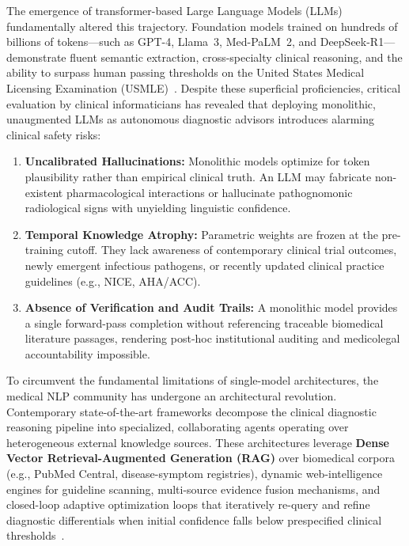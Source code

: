 \documentclass[conference]{IEEEtran}
\begin{document}
The emergence of transformer-based Large Language Models (LLMs) fundamentally altered this trajectory. Foundation models trained on hundreds of billions of tokens---such as GPT-4, Llama~3, Med-PaLM~2, and DeepSeek-R1---demonstrate fluent semantic extraction, cross-specialty clinical reasoning, and the ability to surpass human passing thresholds on the United States Medical Licensing Examination (USMLE)~\cite{singhal2023large, nori2023capabilities}. Despite these superficial proficiencies, critical evaluation by clinical informaticians has revealed that deploying monolithic, unaugmented LLMs as autonomous diagnostic advisors introduces alarming clinical safety risks:
\begin{enumerate}
    \item \textbf{Uncalibrated Hallucinations:} Monolithic models optimize for token plausibility rather than empirical clinical truth. An LLM may fabricate non-existent pharmacological interactions or hallucinate pathognomonic radiological signs with unyielding linguistic confidence.
    \item \textbf{Temporal Knowledge Atrophy:} Parametric weights are frozen at the pre-training cutoff. They lack awareness of contemporary clinical trial outcomes, newly emergent infectious pathogens, or recently updated clinical practice guidelines (e.g., NICE, AHA/ACC).
    \item \textbf{Absence of Verification and Audit Trails:} A monolithic model provides a single forward-pass completion without referencing traceable biomedical literature passages, rendering post-hoc institutional auditing and medicolegal accountability impossible.
\end{enumerate}

To circumvent the fundamental limitations of single-model architectures, the medical NLP community has undergone an architectural revolution. Contemporary state-of-the-art frameworks decompose the clinical diagnostic reasoning pipeline into specialized, collaborating agents operating over heterogeneous external knowledge sources. These architectures leverage \textbf{Dense Vector Retrieval-Augmented Generation (RAG)} over biomedical corpora (e.g., PubMed Central, disease-symptom registries), dynamic web-intelligence engines for guideline scanning, multi-source evidence fusion mechanisms, and closed-loop adaptive optimization loops that iteratively re-query and refine diagnostic differentials when initial confidence falls below prespecified clinical thresholds~\cite{ogdu2025adaptive, kim2024medagents, zuo2025kg4diagnosis}.
\end{document}
